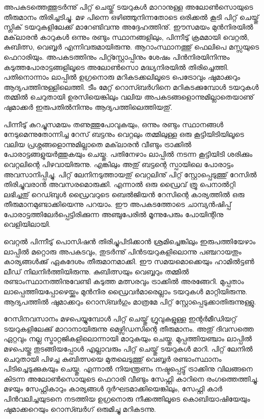 അപകടത്തെത്തുടര്‍ന്നു് പിറ്റ് ചെയ്തു് ടയറുകള്‍ മാറാനുള്ള അലോണ്‍സൊയുടെ തീരുമാനം തിരിച്ചടിച്ചു. മഴ 
പിന്നെ ഒഴിഞ്ഞുനിന്നതോടെ ഒരിക്കല്‍ കൂടി പിറ്റ് ചെയ്തു് സ്ലിക് ടയറുകളിലേക്ക് മാറേണ്ടിവന്നു അദ്ദേഹത്തിനു്. ഈസമയം 
മുന്‍നിരയില്‍ മക്‌ലാരന്‍ കാറുകള്‍ ഒന്നും രണ്ടും സ്ഥാനങ്ങളിലും, പിന്നീടു് ക്രമമായി വെറ്റല്‍, കുബിത്സ, 
വെബ്ബര്‍ എന്നിവരുമായിരുന്നു. ആറാംസ്ഥാനത്തു് ഫെലിപെ മസ്സയുടെ ഫെറാരിയും. അപകടത്തിനും 
പിറ്റ്സ്റ്റോപ്പിനും ശേഷം പിന്‍നിരയിനിന്നും കടുത്തപോരാട്ടങ്ങളിലൂടെ അലോണ്‍സൊ മദ്ധ്യനിരയില്‍ തിരിച്ചെത്തി. പതിനൊന്നാം 
ലാപ്പില്‍ ഉഗ്രനൊരു മറികടക്കലിലൂടെ പെട്രോവും ഷുമാക്കറും ആദ്യപത്തിനുള്ളിലെത്തി. ടീം മേറ്റ് റൊസ്ബര്‍ഗിനെ 
മറികടക്കുമ്പോള്‍ ടയറുകള്‍ തമ്മില്‍ ചെറുതായി ഉരസിയെങ്കിലും വലിയ അപകടങ്ങളൊന്നുമില്ലാതെയാണു് ഷുമാക്കര്‍ 
ഇരുപതില്‍നിന്നും ആദ്യപത്തിലെത്തിയതു്.

പിന്നീടു് കുറച്ചുസമയം തണുത്തുപോവുകയും, ഒന്നും രണ്ടും സ്ഥാനങ്ങള്‍ നേടുമെന്നുതോന്നിച്ച റേസ് ബട്ടനും വെറ്റലും 
തമ്മിലുള്ള ഒരു കൂട്ടിയിടിയിലൂടെ വലിയ പ്രശ്നങ്ങളൊന്നുമില്ലാതെ മക്‌ലാരന്‍ വീണ്ടും ട്രാക്കില്‍ പോരാട്ടങ്ങളുയര്‍ത്തുകയും ചെയ്തു. 
പതിനേഴാം ലാപ്പില്‍ നടന്ന കൂട്ടിയിടി ശരിക്കും വെറ്റലിന്റെ പിഴവായിരുന്നു. എങ്കിലും അതു് ബട്ടന്റെ സ്പായിലെ പോരാട്ടം 
അവസാനിപ്പിച്ചു. പിറ്റ് ലേനിനടുത്തായതു് വെറ്റലിനു് പിറ്റ് സ്റ്റോപ്പെടുത്തു് റേസില്‍ തിരിച്ചുവരാന്‍ അവസരമൊരുക്കി. 
എന്നാല്‍ ഒരു ഡ്രൈവ് ത്രൂ പെനാല്‍റ്റി ലഭിച്ചതു് റെഡ്ബുള്‍ ഡ്രൈവറുടെ ബെല്‍ജിയന്‍ റേസിന്റെ കാര്യത്തില്‍ ഒരു 
തീരുമാനമുണ്ടാക്കിയെന്നു പറയാം. ഈ അപകടത്തോടെ ചാമ്പ്യന്‍ഷിപ്പ് പോരാട്ടത്തിലേര്‍പ്പെട്ടിരിക്കുന്ന അഞ്ചുപേരില്‍ 
മൂന്നുപേരും പോയിന്റിനു വെളിയിലായി.

വെറ്റല്‍ പിന്നീടു് പൊസിഷന്‍ തിരിച്ചുപിടിക്കാന്‍ ശ്രമിച്ചെങ്കിലും ഇരുപത്തിയേഴാം ലാപ്പില്‍ മറ്റൊരു അപകടവും, തുടര്‍ന്നു് 
പിന്‍ടയറുകളിലൊന്നു പഞ്ചറായതും കാര്യങ്ങള്‍ക്കു് ഏകദേശം തീരുമാനമാക്കി. ഈ സമയമൊക്കെയും ഹാമില്‍ട്ടണ്‍ ലീഡ് 
നിലനിര്‍ത്തിയിരുന്നു. കുബിത്സയും വെബ്ബറും തമ്മില്‍ രണ്ടാംസ്ഥാനത്തിനുവേണ്ടി കടുത്ത മത്സരവും ട്രാക്കില്‍ അരങ്ങേറി. 
മുപ്പതാം ലാപ്പെത്തിയപ്പോഴെയ്ക്കും മുന്‍നിര ഡ്രൈവര്‍മാരെല്ലാം ടയറുകള്‍ മാറ്റിയിരുന്നു. ആദ്യപത്തില്‍ ഷുമാക്കറും 
റൊസ്ബര്‍ഗും മാത്രമേ പിറ്റ് സ്റ്റോപ്പെടുക്കാതിരുന്നുള്ളു.

റേസിനവസാനം മഴപെയ്യുമ്പോള്‍ പിറ്റ് ചെയ്തു് ഗ്രൂവുകളുള്ള ഇന്റര്‍മീഡിയറ്റ് ടയറുകളിലേക്കു് മാറാനായിരുന്നു 
മെഴ്സിഡസിന്റെ തീരുമാനം. അതു് ദിവസത്തെ ഏറ്റവും നല്ല സ്ട്രാറ്റജികളിലൊന്നായി മാറുകയും ചെയ്തു. മുപ്പത്തിയഞ്ചാം 
ലാപ്പില്‍ മഴപെയ്തു തുടങ്ങിയപ്പോള്‍ എല്ലാവരും പിറ്റ് ചെയ്തു് ടയറുകള്‍ മാറി. പിറ്റ് ലേനില്‍ ചെറുതായി പിഴച്ച കുബിത്സയെ 
മുതലെടുത്തു് വെബ്ബര്‍ രണ്ടാംസ്ഥാനം പിടിച്ചെടുക്കുകയും ചെയ്തു. എന്നാല്‍ നിയന്ത്രണം നഷ്ടപ്പെട്ടു് ട്രാക്കിനു വിലങ്ങനെ 
കിടന്ന അലോണ്‍സൊയുടെ ഫെറാരി വീണ്ടും സേഫ്റ്റി കാറിനെ രംഗത്തെത്തിച്ചു. മഴയും സേഫ്റ്റികാറും കാര്യങ്ങള്‍ 
ദുര്‍ഘടമാക്കിയെങ്കിലും, സേഫ്റ്റി കാര്‍ പിന്‍വലിച്ചയുടനെ നടത്തിയ ഉഗ്രനൊരു നീക്കത്തിലൂടെ കൊബിയാഷിയേയും 
ഷുമാക്കറെയും റൊസ്ബര്‍ഗ് ഒരുമിച്ചു മറികടന്നു.

